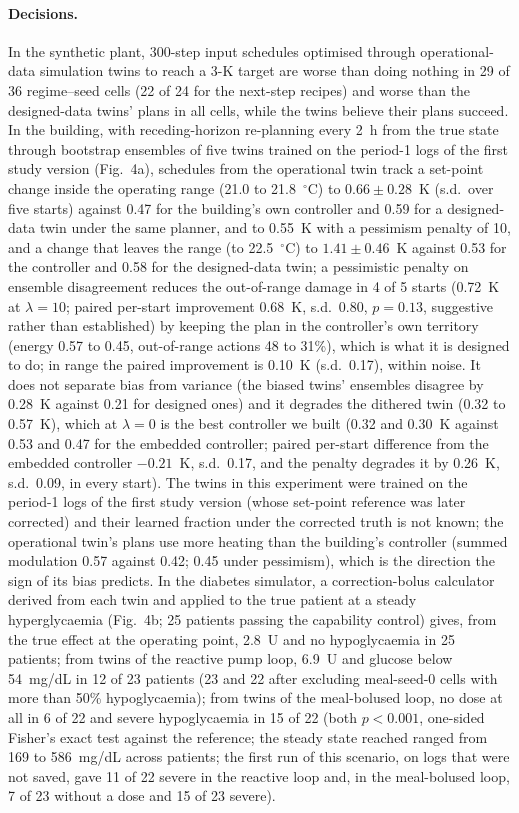 \documentclass[11pt]{article}
\begin{document}
\paragraph{Decisions.} In the synthetic plant, 300-step input schedules optimised through operational-data simulation twins to reach a 3-K target are worse than doing nothing in 29 of 36 regime--seed cells (22 of 24 for the next-step recipes) and worse than the designed-data twins' plans in all cells, while the twins believe their plans succeed. In the building, with receding-horizon re-planning every 2~h from the true state through bootstrap ensembles of five twins trained on the period-1 logs of the first study version (Fig.~4a), schedules from the operational twin track a set-point change inside the operating range (21.0 to 21.8~$^\circ$C) to $0.66\pm0.28$~K (s.d.\ over five starts) against 0.47 for the building's own controller and 0.59 for a designed-data twin under the same planner, and to 0.55~K with a pessimism penalty of 10, and a change that leaves the range (to 22.5~$^\circ$C) to $1.41\pm0.46$~K against 0.53 for the controller and 0.58 for the designed-data twin; a pessimistic penalty on ensemble disagreement \citep{yu2020mopo} reduces the out-of-range damage in 4 of 5 starts (0.72~K at $\lambda=10$; paired per-start improvement 0.68~K, s.d.\ 0.80, $p=0.13$, suggestive rather than established) by keeping the plan in the controller's own territory (energy 0.57 to 0.45, out-of-range actions 48 to 31\%), which is what it is designed to do; in range the paired improvement is 0.10~K (s.d.\ 0.17), within noise. It does not separate bias from variance (the biased twins' ensembles disagree by 0.28~K against 0.21 for designed ones) and it degrades the dithered twin (0.32 to 0.57~K), which at $\lambda=0$ is the best controller we built (0.32 and 0.30~K against 0.53 and 0.47 for the embedded controller; paired per-start difference from the embedded controller $-0.21$~K, s.d.\ 0.17, and the penalty degrades it by 0.26~K, s.d.\ 0.09, in every start). The twins in this experiment were trained on the period-1 logs of the first study version (whose set-point reference was later corrected) and their learned fraction under the corrected truth is not known; the operational twin's plans use more heating than the building's controller (summed modulation 0.57 against 0.42; 0.45 under pessimism), which is the direction the sign of its bias predicts. In the diabetes simulator, a correction-bolus calculator derived from each twin and applied to the true patient at a steady hyperglycaemia (Fig.~4b; 25 patients passing the capability control) gives, from the true effect at the operating point, 2.8~U and no hypoglycaemia in 25 patients; from twins of the reactive pump loop, 6.9~U and glucose below 54~mg/dL in 12 of 23 patients (23 and 22 after excluding meal-seed-0 cells with more than 50\% hypoglycaemia); from twins of the meal-bolused loop, no dose at all in 6 of 22 and severe hypoglycaemia in 15 of 22 (both $p<0.001$, one-sided Fisher's exact test against the reference; the steady state reached ranged from 169 to 586~mg/dL across patients; the first run of this scenario, on logs that were not saved, gave 11 of 22 severe in the reactive loop and, in the meal-bolused loop, 7 of 23 without a dose and 15 of 23 severe).
\end{document}
